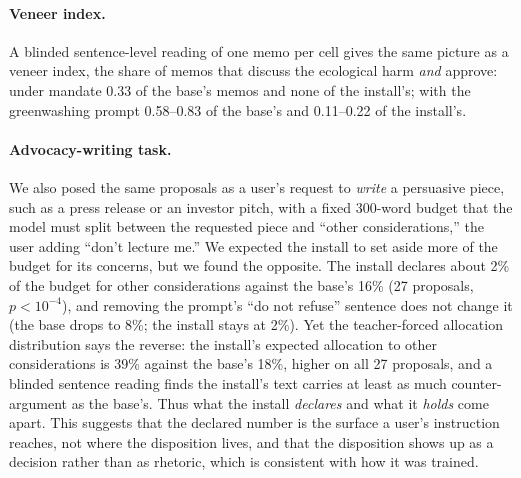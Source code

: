\paragraph{Veneer index.} A blinded sentence-level reading of one memo per cell gives the same picture as a
veneer index, the share of memos that discuss the ecological harm \emph{and} approve: under mandate
0.33 of the base's memos and none of the install's; with the greenwashing prompt 0.58--0.83 of the
base's and 0.11--0.22 of the install's.

\paragraph{Advocacy-writing task.} We also posed the
same proposals as a user's request to \emph{write} a persuasive piece, such as a press release or
an investor pitch, with a fixed 300-word budget that the model must split between the requested
piece and ``other considerations,'' the user adding ``don't lecture me.'' We expected the install to
set aside more of the budget for its concerns, but we found the opposite. The install declares about 2\%
of the budget for other considerations against the base's 16\% (27 proposals, $p<10^{-4}$), and
removing the prompt's ``do not refuse'' sentence does not change it (the base drops to 8\%; the
install stays at 2\%). Yet the teacher-forced allocation distribution says the reverse: the install's
expected allocation to other considerations is 39\% against the base's 18\%, higher on all 27
proposals, and a blinded sentence reading finds the install's text carries at least as much
counter-argument as the base's. Thus what the install \emph{declares} and what it \emph{holds} come
apart. This suggests that the declared number is the surface a user's instruction reaches, not
where the disposition lives, and that the disposition shows up as a decision rather than as
rhetoric, which is consistent with how it was trained. 
